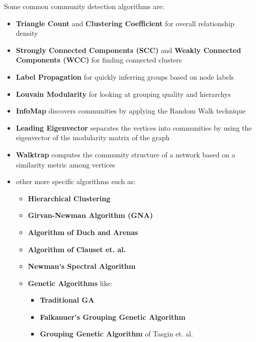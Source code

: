 Some common community detection algorithms are:
 \begin{itemize}[noitemsep]
	\item \textbf{\gls{Triangle Count}} and \textbf{\gls{Clustering Coefficient}} for overall \gls{relationship density}
	\item \textbf{\gls{Strongly Connected Components} (\acrshort{SCC})} and \textbf{\gls{Weakly Connected Components} (\acrshort{WCC})} for finding connected clusters
	\item \textbf{\gls{Label Propagation}} for quickly inferring groups based on node labels
	\item \textbf{\gls{Louvain Modularity}} for looking at \gls{grouping quality} and \glspl{hierarchy}
	\item \textbf{\gls{InfoMap}} discovers communities by applying the \gls{Random Walk} technique
	\item \textbf{\gls{Leading Eigenvector}} separates the vertices into communities by using the eigenvector of the \gls{modularity matrix} of the graph
	\item \textbf{\gls{Walktrap}} computes the community structure of a network based on a \gls{similarity metric} among vertices
	\item other more specific algorithms such as:
         \begin{itemize}[noitemsep]
        	\item \textbf{\gls{Hierarchical Clustering}}
        	\item \textbf{\gls{Girvan-Newman Algorithm} (\acrshort{GNA})}
        	\item \textbf{\gls{Algorithm of Duch and Arenas}}
        	\item \textbf{\gls{Algorithm of Clauset} et. al.}
        	\item \textbf{\gls{Newman's Spectral Algorithm}}
        	\item \textbf{\gls{Genetic Algorithm}s} like:
                 \begin{itemize}[noitemsep]
                	\item \textbf{\gls{Traditional GA}}
                	\item \textbf{\gls{Falkanuer's Grouping Genetic Algorithm}}
                	\item \textbf{\gls{Grouping Genetic Algorithm}} of Tasgin et. al.
                \end{itemize}
        \end{itemize}
\end{itemize}

